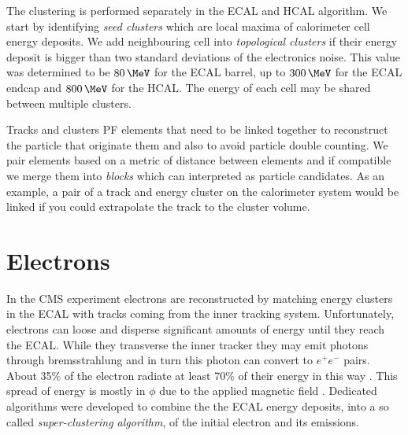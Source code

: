 The clustering is performed separately in the \gls{ECAL} and \gls{HCAL} algorithm. We start by identifying \textit{seed clusters} which are local maxima of calorimeter cell energy deposits. We add neighbouring cell into \textit{topological clusters} if their energy deposit is bigger than two standard deviations of the electronics noise. This value was determined to be $80\,\MeV$ for the \gls{ECAL} barrel, up to $300\,\MeV$ for the \gls{ECAL} endcap and $800\,\MeV$ for the \gls{HCAL}. The energy of each cell may be shared between multiple clusters.

Tracks and clusters \gls{PF} elements that need to be linked together to reconstruct the particle that originate them and also to avoid particle double counting. We pair elements based on a metric of distance between elements and if compatible we merge them into \textit{blocks} which can interpreted as particle candidates. As an example, a pair of a track and energy cluster on the calorimeter system would be linked if you could extrapolate the track to the cluster volume.


\section{Electrons}
\label{SECTION:EventReconstructionPhysicsObjects_Electrons}


In the \gls{CMS} experiment electrons are reconstructed by matching energy clusters in the \gls{ECAL} with tracks coming from the inner tracking system. Unfortunately, electrons can loose and disperse significant amounts of energy until they reach the \gls{ECAL}. While they transverse the inner tracker they may emit photons through bremsstrahlung and in turn this photon can convert to $e^+e^-$ pairs. About 35\% of the electron radiate at least 70\% of their energy in this way \cite{ARTICLE:CMSElectronReconstruction}. This spread of energy is mostly in $\phi$ due to the applied magnetic field \cite{ARTICLE:CMSElectronReconstructionECAL}. Dedicated algorithms were developed to combine the the \gls{ECAL} energy deposits, into a so called \textit{super-clustering algorithm}, of the initial electron and its emissions.

